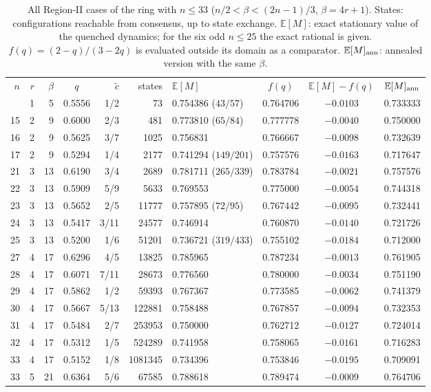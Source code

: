 \documentclass[aps,pre,reprint,superscriptaddress,amsmath,amssymb,longbibliography]{revtex4-2}
\theoremstyle{remark}
\newcommand{\ctil}{\tilde c}
\newcommand{\E}{\mathbb{E}}
\begin{document}
\begin{table}[t]
\caption{All Region-II cases of the ring with $n\le33$
($n/2<\beta<(2n-1)/3$, $\beta=4r+1$). States: configurations reachable
from consensus, up to state exchange. $\E[M]$: exact stationary value of
the quenched dynamics; for the six odd $n\le25$ the exact rational is
given. $f(q)=(2-q)/(3-2q)$ is evaluated outside its domain as a
comparator. $\E[M]_{\rm ann}$: annealed version with the same $\beta$.}
\label{tab:exact}
\begin{ruledtabular}
\begin{tabular}{rrrcrrlccc}
$n$ & $r$ & $\beta$ & $q$ & $\ctil$ & states & $\E[M]$ & $f(q)$ & $\E[M]-f(q)$ & $\E[M]_{\rm ann}$\\
\colrule
 9 & 1 &  5 & 0.5556 & 1/2  & 73      & 0.754386 ($43/57$)   & 0.764706 & $-0.0103$ & 0.733333\\
15 & 2 &  9 & 0.6000 & 2/3  & 481     & 0.773810 ($65/84$)   & 0.777778 & $-0.0040$ & 0.750000\\
16 & 2 &  9 & 0.5625 & 3/7  & 1025    & 0.756831             & 0.766667 & $-0.0098$ & 0.732639\\
17 & 2 &  9 & 0.5294 & 1/4  & 2177    & 0.741294 ($149/201$) & 0.757576 & $-0.0163$ & 0.717647\\
21 & 3 & 13 & 0.6190 & 3/4  & 2689    & 0.781711 ($265/339$) & 0.783784 & $-0.0021$ & 0.757576\\
22 & 3 & 13 & 0.5909 & 5/9  & 5633    & 0.769553             & 0.775000 & $-0.0054$ & 0.744318\\
23 & 3 & 13 & 0.5652 & 2/5  & 11777   & 0.757895 ($72/95$)   & 0.767442 & $-0.0095$ & 0.732441\\
24 & 3 & 13 & 0.5417 & 3/11 & 24577   & 0.746914             & 0.760870 & $-0.0140$ & 0.721726\\
25 & 3 & 13 & 0.5200 & 1/6  & 51201   & 0.736721 ($319/433$) & 0.755102 & $-0.0184$ & 0.712000\\
27 & 4 & 17 & 0.6296 & 4/5  & 13825   & 0.785965             & 0.787234 & $-0.0013$ & 0.761905\\
28 & 4 & 17 & 0.6071 & 7/11 & 28673   & 0.776560             & 0.780000 & $-0.0034$ & 0.751190\\
29 & 4 & 17 & 0.5862 & 1/2  & 59393   & 0.767367             & 0.773585 & $-0.0062$ & 0.741379\\
30 & 4 & 17 & 0.5667 & 5/13 & 122881  & 0.758488             & 0.767857 & $-0.0094$ & 0.732353\\
31 & 4 & 17 & 0.5484 & 2/7  & 253953  & 0.750000             & 0.762712 & $-0.0127$ & 0.724014\\
32 & 4 & 17 & 0.5312 & 1/5  & 524289  & 0.741958             & 0.758065 & $-0.0161$ & 0.716283\\
33 & 4 & 17 & 0.5152 & 1/8  & 1081345 & 0.734396             & 0.753846 & $-0.0195$ & 0.709091\\
33 & 5 & 21 & 0.6364 & 5/6  & 67585   & 0.788618             & 0.789474 & $-0.0009$ & 0.764706\\
\end{tabular}
\end{ruledtabular}
\end{table}
\end{document}
